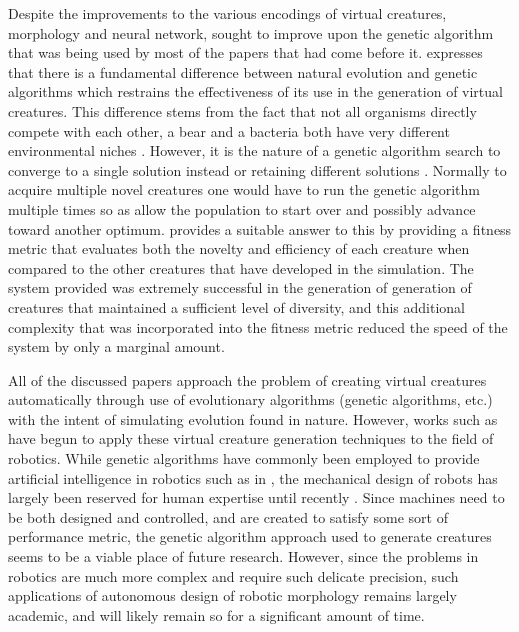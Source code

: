 \documentclass[12pt]{article}
\begin{document}
Despite the improvements to the various encodings of virtual creatures, morphology and neural network, \cite{lehman2011evolving} sought to improve upon the genetic algorithm that was being used by most of the papers that had come before it.
\cite{lehman2011evolving} expresses that there is a fundamental difference between natural evolution and genetic algorithms which restrains the effectiveness of its use in the generation of virtual creatures.
This difference stems from the fact that not all organisms directly compete with each other, a bear and a bacteria both have very different environmental niches \cite{lehman2011evolving}.
However, it is the nature of a genetic algorithm search to converge to a single solution instead or retaining different solutions \cite{stanley2002evolving}.
Normally to acquire multiple novel creatures one would have to run the genetic algorithm multiple times so as allow the population to start over and possibly advance toward another optimum.
\cite{lehman2011evolving} provides a suitable answer to this by providing a fitness metric that evaluates both the novelty and efficiency of each creature when compared to the other creatures that have developed in the simulation.
The system provided was extremely successful in the generation of generation of creatures that maintained a sufficient level of diversity, and this additional complexity that was incorporated into the fitness metric reduced the speed of the system by only a marginal amount.

All of the discussed papers approach the problem of creating virtual creatures automatically through use of evolutionary algorithms (genetic algorithms, etc.) with the intent of simulating evolution found in nature.
However, works such as \cite{hornby2001evolution} have begun to apply these virtual creature generation techniques to the field of robotics.
While genetic algorithms have commonly been employed to provide artificial intelligence in robotics such as in \cite{srinivas1994muiltiobjective}, the mechanical design of robots has largely been reserved for human expertise until recently \cite{hornby2001evolution}.
Since machines need to be both designed and controlled, and are created to satisfy some sort of performance metric, the genetic algorithm approach used to generate creatures seems to be a viable place of future research.
However, since the problems in robotics are much more complex and require such delicate precision, such applications of autonomous design of robotic morphology remains largely academic, and will likely remain so for a significant amount of time.
\end{document}
